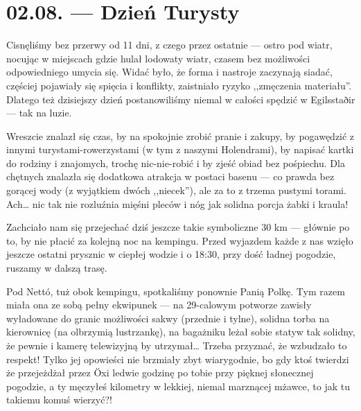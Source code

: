 \chapter*{02.08. --- Dzień Turysty}


Cisnęliśmy bez przerwy od 11 dni, z czego przez ostatnie --- ostro pod wiatr, nocując w miejscach gdzie hulał lodowaty wiatr, czasem bez możliwości odpowiedniego umycia się. Widać było, że forma i nastroje zaczynają siadać, częściej pojawiały się spięcia i konflikty, zaistniało ryzyko ,,zmęczenia materiału''. Dlatego też dzisiejszy dzień postanowiliśmy niemal w całości spędzić w Egilsstaðir --- tak na luzie.

Wreszcie znalazł się czas, by na spokojnie zrobić pranie i zakupy, by pogawędzić z innymi turystami-rowerzystami (w tym z naszymi Holendrami), by napisać kartki do rodziny i znajomych, trochę nic-nie-robić i by zjeść obiad bez pośpiechu. Dla chętnych znalazła się dodatkowa atrakcja w postaci basenu --- co prawda bez gorącej wody (z wyjątkiem dwóch ,,niecek''), ale za to z trzema pustymi torami. Ach… nic tak nie rozluźnia mięśni pleców i nóg jak solidna porcja żabki i kraula!


Zachciało nam się przejechać dziś jeszcze takie symboliczne 30 km --- głównie po to, by nie płacić za kolejną noc na kempingu. Przed wyjazdem każde z nas wzięło jeszcze ostatni prysznic w ciepłej wodzie i o 18:30, przy dość ładnej pogodzie, ruszamy w dalszą trasę.

Pod Nettó, tuż obok kempingu, spotkaliśmy ponownie Panią Polkę. Tym razem miała ona ze sobą pełny ekwipunek --- na 29-calowym potworze zawisły wyładowane do granic możliwości sakwy (przednie i tylne), solidna torba na kierownicę (na olbrzymią lustrzankę), na bagażniku leżał sobie statyw tak solidny, że pewnie i kamerę telewizyjną by utrzymał… Trzeba przyznać, że wzbudzało to respekt! Tylko jej opowieści nie brzmiały zbyt wiarygodnie, bo gdy ktoś twierdzi że przejeżdżał przez Öxi ledwie godzinę po tobie przy pięknej słonecznej pogodzie, a ty męczyłeś kilometry w lekkiej, niemal marznącej mżawce, to jak tu takiemu komuś wierzyć?!


